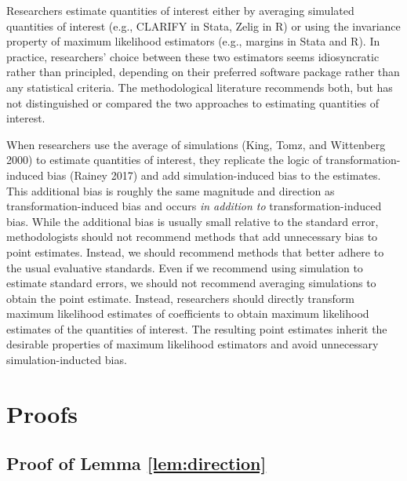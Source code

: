 \documentclass[12pt]{article}
\begin{document}
Researchers estimate quantities of interest either by averaging simulated quantities of interest (e.g., CLARIFY in Stata, Zelig in R) or using the invariance property of maximum likelihood estimators (e.g., margins in Stata and R). In practice, researchers' choice between these two estimators seems idiosyncratic rather than principled, depending on their preferred software package rather than any statistical criteria. The methodological literature recommends both, but has not distinguished or compared the two approaches to estimating quantities of interest.

When researchers use the average of simulations (King, Tomz, and Wittenberg 2000) to estimate quantities of interest, they replicate the logic of transformation-induced bias (Rainey 2017) and add simulation-induced bias to the estimates. This additional bias is roughly the same magnitude and direction as transformation-induced bias and occurs \textit{in addition to} transformation-induced bias. While the additional bias is usually small relative to the standard error, methodologists should not recommend methods that add unnecessary bias to point estimates. Instead, we should recommend methods that better adhere to the usual evaluative standards. Even if we recommend using simulation to estimate standard errors, we should not recommend averaging simulations to obtain the point estimate. Instead, researchers should directly transform maximum likelihood estimates of coefficients to obtain maximum likelihood estimates of the quantities of interest. The resulting point estimates inherit the desirable properties of maximum likelihood estimators and avoid unnecessary simulation-inducted bias.

\singlespace
\small



\newpage
\appendix


\section{Proofs}\label{appendix:proofs}

\subsection{Proof of Lemma \ref{lem:direction}}
\end{document}

